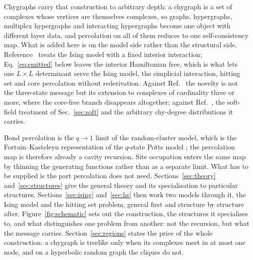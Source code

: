 \documentclass[aps,pre,twocolumn,superscriptaddress,floatfix]{revtex4-2}
\begin{document}
Chygraphs \cite{vazquez2023pre,vazquez2024comnet} carry that construction to
arbitrary depth: a chygraph is a set of complexes whose vertices are themselves
complexes, so graphs, hypergraphs, multiplex hypergraphs and interacting
hypergraphs become one object with different layer data, and percolation on all
of them reduces to one self-consistency map. What is added here is on the model
side rather than the structural side. Reference~\cite{Yoon11} treats the Ising
model with a fixed interior interaction; Eq.~\eqref{eq:emitted} below leaves the
interior Hamiltonian free, which is what lets one $L\times L$ determinant serve
the Ising model, the simplicial interaction, hitting set and core percolation
without rederivation. Against Ref.~\cite{Liu12} the novelty is not the
three-state message but its extension to complexes of cardinality three or more,
where the core-free branch disappears altogether; against Ref.~\cite{Cou20}, the
soft-field treatment of Sec.~\ref{sec:soft} and the arbitrary chy-degree
distributions it carries.

Bond percolation is the $q\to1$ limit of the random-cluster model, which is the
Fortuin--Kasteleyn representation of the $q$-state Potts model
\cite{FK72}; the percolation map is therefore already a cavity recursion. Site
occupation enters the same map by thinning the generating functions rather than
as a separate limit.
What has to be supplied is the part percolation does not need. Sections~\ref{sec:theory}
and~\ref{sec:structures} give the general theory and its specialisation to
particular structures. Sections~\ref{sec:ising} and~\ref{sec:hs} then work two
models through it, the Ising model and the hitting set problem, general first
and structure by structure after. Figure~\ref{fig:schematic} sets out the
construction, the structures it specialises to, and what distinguishes one
problem from another: not the recursion, but what the message carries. Section~\ref{sec:regions} states the price of
the whole construction: a chygraph is treelike only when its complexes meet in
at most one node, and on a hyperbolic random graph the cliques do not.
\end{document}
